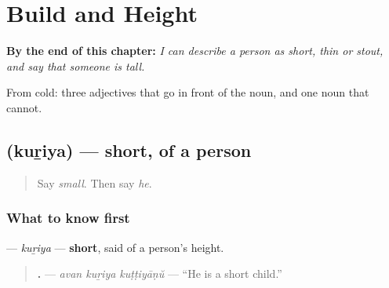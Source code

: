 
\chapter{Build and Height}
\label{ch:ml-build}

\begin{chapteropening}
\textbf{By the end of this chapter:} \emph{I can describe a person as short, thin or stout, and say that someone is tall.}

From cold: three adjectives that go in front of the noun, and one noun that cannot.
\end{chapteropening}

\section[\texorpdfstring{\ml{കുറിയ} (kuṟiya)}{കുറിയ (kuṟiya)}]{ (kuṟiya) — short, of a person}

\label{lesson:ML-C101-kuriya}



\begin{quote}
Say \emph{small}. Then say \emph{he}.
\end{quote}

\subsection*{What to know first}
\textbf{} — \emph{kuṟiya} — \textbf{short}, said of a person's height.

\begin{quote}
\textbf{  .} — \emph{avan kuṟiya kuṭṭiyāṇŭ} — \textquotedblleft{}He is a short child.\textquotedblright{}
\end{quote}

